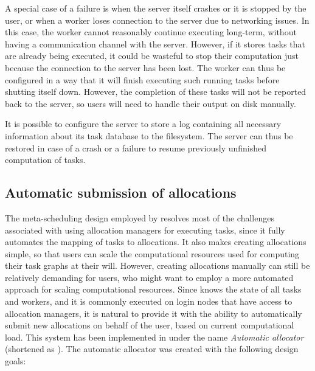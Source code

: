 A special case of a failure is when the server itself crashes or it is stopped by the user, or when
a worker loses connection to the server due to networking issues. In this case, the worker cannot
reasonably continue executing long-term, without having a communication channel with the server.
However, if it stores tasks that are already being executed, it could be wasteful to stop their
computation just because the connection to the server has been lost. The worker can thus be
configured in a way that it will finish executing such running tasks before shutting itself down.
However, the completion of these tasks will not be reported back to the server, so users will need
to handle their output on disk manually.

It is possible to configure the server to store a log containing all necessary information about
its task database to the filesystem. The server can thus be restored in case of a crash or a
failure to resume previously unfinished computation of tasks.

\subsection{Automatic submission of allocations}
\label{hq:automatic-allocation}
The meta-scheduling design employed by \hyperqueue{} resolves most of the challenges
associated with using allocation managers for executing tasks, since it fully automates the mapping
of tasks to allocations. It also makes creating allocations simple, so that users can scale the
computational resources used for computing their task graphs at their will. However, creating
allocations manually can still be relatively demanding for users, who might want to employ a more
automated approach for scaling computational resources. Since \hyperqueue{} knows the
state of all tasks and workers, and it is commonly executed on login nodes that have access to
allocation managers, it is natural to provide it with the ability to automatically submit new
allocations on behalf of the user, based on current computational load. This system has been
implemented in \hq{} under the name \emph{Automatic allocator} (shortened as \autoalloc{}). The automatic
allocator was created with the following design goals:

